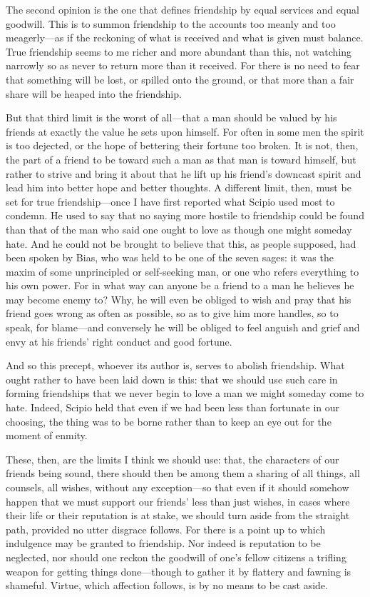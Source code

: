  The second opinion is the one that defines friendship by equal services and equal goodwill. This is to summon friendship to the accounts too meanly and too meagerly—as if the reckoning of what is received and what is given must balance. True friendship seems to me richer and more abundant than this, not watching narrowly so as never to return more than it received. For there is no need to fear that something will be lost, or spilled onto the ground, or that more than a fair share will be heaped into the friendship.

 But that third limit is the worst of all—that a man should be valued by his friends at exactly the value he sets upon himself. For often in some men the spirit is too dejected, or the hope of bettering their fortune too broken. It is not, then, the part of a friend to be toward such a man as that man is toward himself, but rather to strive and bring it about that he lift up his friend's downcast spirit and lead him into better hope and better thoughts. A different limit, then, must be set for true friendship—once I have first reported what Scipio used most to condemn. He used to say that no saying more hostile to friendship could be found than that of the man who said one ought to love as though one might someday hate. And he could not be brought to believe that this, as people supposed, had been spoken by Bias, who was held to be one of the seven sages: it was the maxim of some unprincipled or self-seeking man, or one who refers everything to his own power. For in what way can anyone be a friend to a man he believes he may become enemy to? Why, he will even be obliged to wish and pray that his friend goes wrong as often as possible, so as to give him more handles, so to speak, for blame—and conversely he will be obliged to feel anguish and grief and envy at his friends' right conduct and good fortune.

 And so this precept, whoever its author is, serves to abolish friendship. What ought rather to have been laid down is this: that we should use such care in forming friendships that we never begin to love a man we might someday come to hate. Indeed, Scipio held that even if we had been less than fortunate in our choosing, the thing was to be borne rather than to keep an eye out for the moment of enmity.

 These, then, are the limits I think we should use: that, the characters of our friends being sound, there should then be among them a sharing of all things, all counsels, all wishes, without any exception—so that even if it should somehow happen that we must support our friends' less than just wishes, in cases where their life or their reputation is at stake, we should turn aside from the straight path, provided no utter disgrace follows. For there is a point up to which indulgence may be granted to friendship. Nor indeed is reputation to be neglected, nor should one reckon the goodwill of one's fellow citizens a trifling weapon for getting things done—though to gather it by flattery and fawning is shameful. Virtue, which affection follows, is by no means to be cast aside.

